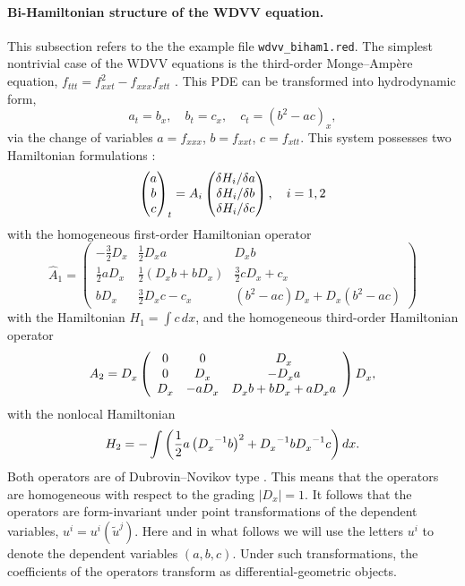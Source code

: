 \paragraph*{Bi-Hamiltonian structure of the WDVV equation.}
\label{cdesec:bi-hamilt-struct-1}
This subsection refers to the the example file \texttt{wdvv\_biham1.red}.
The simplest nontrivial case of the WDVV equations is the third-order
Monge--Amp\`ere equation, $f_{ttt} = f_{xxt}^2 - f_{xxx}f_{xtt}$
\cite{Dubrovin:96}. This PDE can be transformed into hydrodynamic form,
\begin{equation*}
  a_t=b_x,\quad b_t=c_x,\quad c_t=(b^2-ac)_x,
\end{equation*}
via the change of variables $a=f_{xxx}$, $b=f_{xxt}$, $c=f_{xtt}$. This system
possesses two Hamiltonian formulations \cite{Ferapontov:97}:
\begin{equation*}
  \begin{pmatrix}
    a \\ b \\ c
  \end{pmatrix}_t =A_i
  \begin{pmatrix}
    \fd{H_i}{a}\\ \fd{H_i}{b} \\ \fd{H_i}{c}
  \end{pmatrix},\quad i=1,2
\end{equation*}
with the homogeneous first-order Hamiltonian operator
\[
\hat{A}_{1}=%
\begin{pmatrix}
-\frac{3}{2}D _{x}^{{}} & \frac{1}{2}D _{x}^{{}}a & D
_{x}^{{}}b \\
\frac{1}{2}aD _{x}^{{}} & \frac{1}{2}(D _{x}^{{}}b+bD
_{x}^{{}}) & \frac{3}{2}cD _{x}^{{}}+c_{x} \\
bD _{x}^{{}} & \frac{3}{2}D _{x}^{{}}c-c_{x} &
(b^{2}-ac)D _{x}^{{}}+D _{x}^{{}}(b^{2}-ac)%
\end{pmatrix}
\]%
with the Hamiltonian $H_1 = \int c \, dx$,
and the homogeneous third-order Hamiltonian operator
\[
  A_2= D_x^{}\left(
    \begin{array}{ccc}
      0 & 0 & \displaystyle D_x^{} \\
      0 & \displaystyle D_x^{} & -\displaystyle D_x^{}a \\
      \displaystyle D_x^{} & -a\displaystyle D_x^{} &
      \displaystyle D_x^{}b + bD_x^{} + a D_x^{} a
    \end{array}\right)
  D_x^{},
\]
with the nonlocal Hamiltonian
\[
  H_2=-\int\left(  \frac{1}{2}a\left({D_x^{}}^{-1}b\right)^2 + {D_x^{}}^{-1}b
  {D_x^{}}^{-1}c\right)dx.
\]
Both operators are of Dubrovin--Novikov type \cite{DubrovinNovikov:83,DubrovinNovikov:84}.
This means that the
operators are homogeneous with respect to the grading $|D_x|=1$. It follows
that the operators are form-invariant under point transformations of the
dependent variables, $u^i=u^i(\tilde u^j)$. Here and in what follows we will
use the letters $u^i$ to denote the dependent variables $(a,b,c)$. Under such
transformations, the coefficients of the operators transform as
differential-geometric objects.


